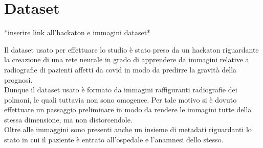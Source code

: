 \chapter{Dataset}
\label{ch:Dataset}

*inserire link all'hackaton e immagini dataset*

Il dataset usato per effettuare lo studio è stato preso da un hackaton riguardante la creazione di una rete neurale in grado di apprendere 
da immagini relative a radiografie di pazienti affetti da covid in modo da predirre la gravità della prognosi.
\\
Dunque il dataset usato è formato da immagini raffiguranti radiografie dei polmoni, le quali tuttavia non sono omogenee. Per tale motivo 
si è dovuto effettuare un passaggio preliminare in modo da rendere le immagini tutte della stessa dimensione, ma non distorcendole.
\\
Oltre alle immaggini sono presenti anche un insieme di metadati riguardanti lo stato in cui il paziente è entrato all'ospedale e l'anamnesi dello stesso.
